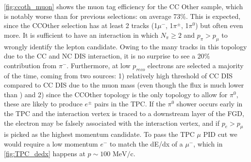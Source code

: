 \autoref{fig:ccoth_muon} shows the muon tag efficiency for the CC Other sample, which is notably worse than for previous selections: on average 73\%. This is expected, since the CCOther selection has at least 2 tracks (1$\mu^-$, 1$\pi^{\pm}$, 1$\pi^0$) but often even more. It is sufficient to have an interaction in which $N_\pi \ge 2$ and $p_{\pi} > p_{\mu}$ to wrongly identify the lepton candidate. Owing to the many tracks in this topology due to the CC and NC DIS interaction, it is no surprise to see a 20\% contribution from $\pi^-$. Furthermore, at low $p_{reco}$ electrons are selected a majority of the time, coming from two sources: 1) relatively high threshold of \numu CC DIS compared to \nue CC DIS due to the muon mass (even though the \nue flux is much lower than \numu {}) and 2) since the CCOther topology is the only topology to allow for $\pi^0$, these are likely to produce $e^\pm$ pairs in the TPC. If the $\pi^0$ shower occurs early in the TPC and the interaction vertex is traced to a downstream layer of the FGD, the electron may be falsely associated with the interaction vertex, and if $p_e > p_\mu$ is picked as the highest momentum candidate. To pass the TPC $\mu$ PID cut we would require a low momentum $e^-$ to match the dE/dx of a $\mu^-$, which in \autoref{fig:TPC_dedx} happens at $p\sim100\text{ MeV/c}$.
